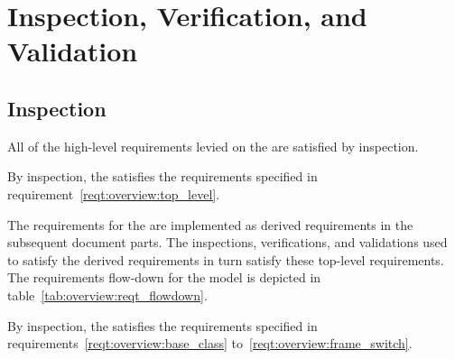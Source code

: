 %

\chapter{Inspection, Verification, and Validation}
\label{ch:overview:ivv}

\section{Inspection}\label{ch:overview:inspect}
All of the high-level requirements levied on the \ModelDesc
are satisfied by inspection.

\label{inspect:overview:top_level}
By inspection, the \ModelDesc satisfies the requirements specified in
requirement~\ref{reqt:overview:top_level}.

\label{inspect:overview:derived}
The requirements for the \ModelDesc are implemented as derived
requirements in the subsequent document parts. The inspections,
verifications, and validations used to satisfy the derived
requirements in turn satisfy these top-level requirements.
The requirements flow-down for the model is depicted in
table~\ref{tab:overview:reqt_flowdown}.

By inspection, the \ModelDesc satisfies the requirements specified in
requirements~\ref{reqt:overview:base_class}
to~\ref{reqt:overview:frame_switch}.

